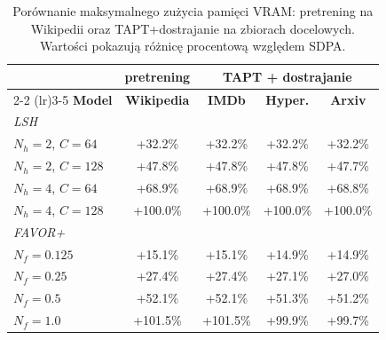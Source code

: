 \documentclass[a4paper,11pt,twoside]{report}
\theoremstyle{definition}
\begin{document}
\begin{table}[t!]
\centering
\caption{Porównanie maksymalnego zużycia pamięci VRAM: pretrening na Wikipedii oraz TAPT+dostrajanie na zbiorach docelowych. Wartości pokazują różnicę procentową względem SDPA.}
\label{tab:vram-comparison}
\smallskip
\begin{tabular}{@{}lcccc@{}}
\toprule
& \textbf{pretrening} & \multicolumn{3}{c}{\textbf{TAPT + dostrajanie}} \\
\cmidrule(lr){2-2}
\cmidrule(lr){3-5}
\textbf{Model} & \textbf{Wikipedia} & \textbf{IMDb} & \textbf{Hyper.} & \textbf{Arxiv} \\
\midrule
\multicolumn{5}{l}{\textit{LSH}} \\
$N_h{=}2$, $C{=}64$ & +32.2\% & +32.2\% & +32.2\% & +32.2\% \\
$N_h{=}2$, $C{=}128$ & +47.8\% & +47.8\% & +47.8\% & +47.7\% \\
$N_h{=}4$, $C{=}64$ & +68.9\% & +68.9\% & +68.9\% & +68.8\% \\
$N_h{=}4$, $C{=}128$ & +100.0\% & +100.0\% & +100.0\% & +100.0\% \\
\midrule
\multicolumn{5}{l}{\textit{FAVOR+}} \\
$N_f{=}0.125$ & +15.1\% & +15.1\% & +14.9\% & +14.9\% \\
$N_f{=}0.25$ & +27.4\% & +27.4\% & +27.1\% & +27.0\% \\
$N_f{=}0.5$ & +52.1\% & +52.1\% & +51.3\% & +51.2\% \\
$N_f{=}1.0$ & +101.5\% & +101.5\% & +99.9\% & +99.7\% \\
\bottomrule
\end{tabular}
\end{table}
\end{document}
